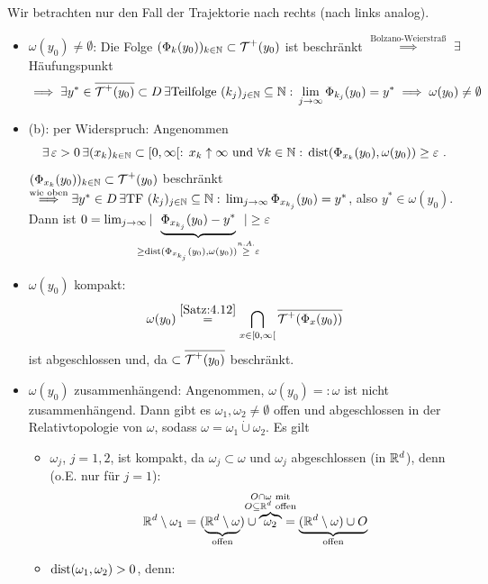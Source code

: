 \documentclass[a4paper]{article}
\begin{document}
\begin{Beweis}
Wir betrachten nur den Fall der Trajektorie nach rechts (nach links analog).
\begin{itemize}
\item $\omega(y_0)\ne \emptyset$: Die Folge $(\Phi_k(y_0))_{k\in\operatorname{\mathbb N}}\subset \operatorname{\mathcal{T}}^+(y_0)$ ist beschränkt $\overset{\text{Bolzano-Weierstraß}}{\implies}$ $\exists$ Häufungspunkt
\[\implies \exists y^*\in\overline{\operatorname{\mathcal{T}}^+(y_0)}\subset D\,\exists \text{Teilfolge }(k_j)_{j\in\operatorname{\mathbb N}}\subseteq\operatorname{\mathbb N}:\,\lim_{j\to\infty}\Phi_{k_j}(y_0)=y^*\implies \omega(y_0)\ne\emptyset\]
\item (b): per Widerspruch: Angenommen 
\[\exists\operatorname{\varepsilon}>0\,\exists (x_k)_{k\in\operatorname{\mathbb N}}\subset[0,\infty[:\, x_k\uparrow\infty\text{ und }\forall k\in\operatorname{\mathbb N}:\,\operatorname{\mathrm{dist}}(\Phi_{x_k}(y_0),\omega(y_0))\ge \operatorname{\varepsilon}\,.\] $(\Phi_{x_k}(y_0))_{k\in\operatorname{\mathbb N}}\subset \operatorname{\mathcal{T}}^+(y_0)$ beschränkt $\overset{\text{wie oben}}{\implies}\exists y^*\in D\,\exists\text{TF } (k_j)_{j\in\operatorname{\mathbb N}}\subseteq\operatorname{\mathbb N}:\,\lim_{j\to\infty}\Phi_{x_{k_j}}(y_0)=y^*$, also $y^*\in \omega(y_0)$. Dann ist $0=\lim_{j\to\infty}|\hspace{-0.5cm}\underbrace{\Phi_{x_{k_j}}(y_0)-y^*}_{\ge \dist(\Phi_{x_{k_j}}(y_0),\omega(y_0))\overset{n.A.}{\ge}\ve}\hspace{-0.5cm}|\ge \ve$  \lightning
\item $\omega(y_0)$ kompakt:
\[\omega(y_0)\overset{\ref{Satz:4.12}}{=}\bigcap_{x\in[0,\infty[}\overline{\operatorname{\mathcal{T}}^+(\Phi_x(y_0))}\]
ist abgeschlossen und, da $\subset \overline{\operatorname{\mathcal{T}}^+(y_0)}$ beschränkt.
\item $\omega(y_0)$ zusammenhängend: Angenommen, $\omega(y_0)=:\omega$ ist nicht zusammenhängend. Dann gibt es $\omega_1,\omega_2\ne \emptyset$ offen und abgeschlossen in der Relativtopologie von $\omega$, sodass $\omega=\omega_1\dot{\cup}\omega_2$. Es gilt
\begin{itemize}
\item $\omega_j$, $j=1,2$, ist kompakt, da $\omega_j\subset \omega$ und $\omega_j$ abgeschlossen (in $\mathbb R^d$), denn (o.E. nur für $j=1$):
\[\RR^d\setminus \omega_1=(\underbrace{\RR^d\setminus\omega}_{\text{offen}})\cup \hspace{-0.4cm}\overbrace{\omega_2}^{\substack{O\cap \omega\text{ mit}\\ O\subseteq\RR^d \te{offen}}}\hspace{-0.4cm}=\underbrace{(\RR^d\setminus \omega)\cup O}_{\text{offen}}\]
\item $\operatorname{\mathrm{dist}}(\omega_1,\omega_2)>0$, denn:
\[\begin{array}{clc}

\end{array}\]
\end{itemize}
\end{itemize}
\end{Beweis}
\end{document}
